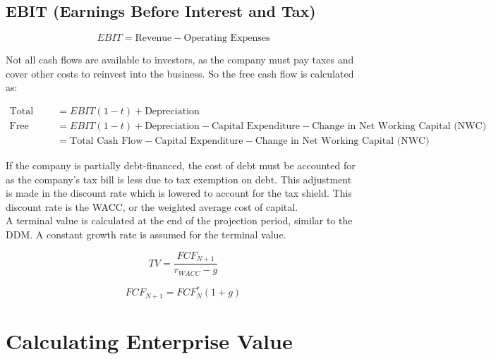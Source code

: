 \subsection*{EBIT (Earnings Before Interest and Tax)}
\begin{equation}
    EBIT = \text{Revenue} - \text{Operating Expenses}
\end{equation}

Not all cash flows are available to investors, as the company must pay taxes and cover other costs to reinvest into the business. So the free cash flow is calculated as:

\begin{align}
    \text{Total Cash Flow } &= EBIT (1-t) + \text{Depreciation}\\
    \text{Free Cash Flow } &= EBIT (1-t) + \text{Depreciation} - \text{Capital Expenditure} - \text{Change in Net Working Capital (NWC)}\\
    &= \text{Total Cash Flow} - \text{Capital Expenditure} - \text{Change in Net Working Capital (NWC)}
\end{align}

If the company is partially debt-financed, the cost of debt must be accounted for as the company's tax bill is less due to tax exemption on debt. This adjustment is made in the discount rate which is lowered to account for the tax shield. This discount rate is the WACC, or the weighted average cost of capital.\\

A terminal value is calculated at the end of the projection period, similar to the DDM. A constant growth rate is assumed for the terminal value. 

\begin{equation}
    TV = \frac{FCF_{N+1}}{r_{WACC}-g}
\end{equation}

\begin{equation}
    FCF_{N+1} = FCF_N^*(1+g)
\end{equation}

\renewcommand{\thesection}{4.3 - 4.5}
\section{Calculating Enterprise Value}
\setcounter{section}{5}
\renewcommand{\thesection}{\arabic{chapter}.\arabic{section}}

